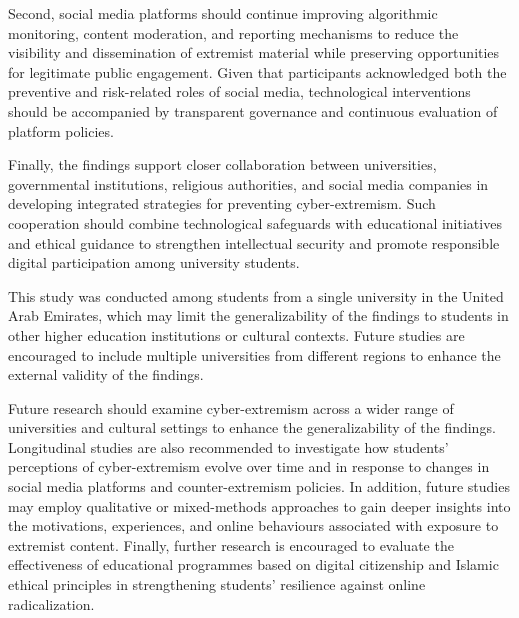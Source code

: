 \documentclass[10pt]{NSP1}
\begin{document}
Second, social media platforms should continue improving algorithmic monitoring, content moderation, and reporting mechanisms to reduce the visibility and dissemination of extremist material while preserving opportunities for legitimate public engagement. Given that participants acknowledged both the preventive and risk-related roles of social media, technological interventions should be accompanied by transparent governance and continuous evaluation of platform policies.

Finally, the findings support closer collaboration between universities, governmental institutions, religious authorities, and social media companies in developing integrated strategies for preventing cyber-extremism. Such cooperation should combine technological safeguards with educational initiatives and ethical guidance to strengthen intellectual security and promote responsible digital participation among university students.

\par\medskip{}\smallskip

This study was conducted among students from a single university in the United Arab Emirates, which may limit the generalizability of the findings to students in other higher education institutions or cultural contexts. Future studies are encouraged to include multiple universities from different regions to enhance the external validity of the findings.

\par\medskip{}\smallskip

Future research should examine cyber-extremism across a wider range of universities and cultural settings to enhance the generalizability of the findings. Longitudinal studies are also recommended to investigate how students' perceptions of cyber-extremism evolve over time and in response to changes in social media platforms and counter-extremism policies. In addition, future studies may employ qualitative or mixed-methods approaches to gain deeper insights into the motivations, experiences, and online behaviours associated with exposure to extremist content. Finally, further research is encouraged to evaluate the effectiveness of educational programmes based on digital citizenship and Islamic ethical principles in strengthening students' resilience against online radicalization.
\end{document}
